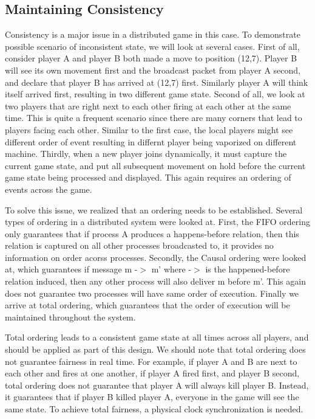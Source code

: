\subsection{Maintaining Consistency}\label{DesignConsistency}

Consistency is a major issue in a distributed game in this case. To demonstrate possible scenario of inconsistent state, we will look at several cases. First of all, consider player A and player B both made a move to position (12,7). Player B will see its own movement first and the broadcast packet from player A second, and declare that player B has arrived at (12,7) first. Similarly player A will think itself arrived first, resulting in two different game state. Second of all, we look at two players that are right next to each other firing at each other at the same time. This is quite a frequent scenario since there are many corners that lead to players facing each other. Similar to the first case, the local players might see different order of event resulting in differnt player being vaporized on different machine. Thirdly, when a new player joins dynamically, it must capture the current game state, and put all subsequent movement on hold before the current game state being processed and displayed. This again requires an ordering of events across the game.

To solve this issue, we realized that an ordering needs to be established. Several types of ordering in a distributed system were looked at. First, the FIFO ordering only guarantees that if process A produces a happens-before relation, then this relation is captured on all other processes broadcasted to, it provides no information on order acorss processes. Secondly, the Causal ordering were looked at, which guarantees if message m -$>$ m' where -$>$ is the happened-before relation induced, then any other process will also deliver m before m'. This again does not guarantee two processes will have same order of execution. Finally we arrive at total ordering, which guarantees that the order of execution will be maintained throughout the system.

Total ordering leads to a consistent game state at all times across all players, and should be applied as part of this design. We should note that total ordering does not guarantee fairness in real time. For example, if player A and B are next to each other and fires at one another, if player A fired first, and player B second, total ordering does not guarantee that player A will always kill player B. Instead, it guarantees that if player B killed player A, everyone in the game will see the same state. To achieve total fairness, a physical clock synchronization is needed.
